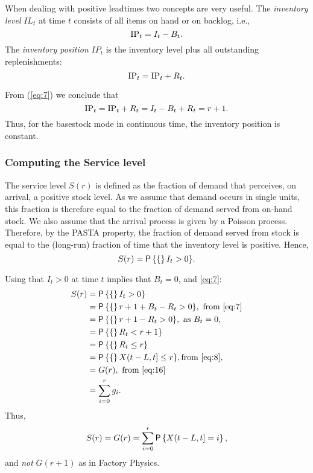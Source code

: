 When dealing with positive leadtimes two concepts are very useful. The \emph{inventory level} $IL_t$ at time $t$ consists of all items on hand or on backlog, i.e.,
\begin{equation}\label{eq:23}
  \textrm{IP}_t = I_t - B_t.
\end{equation}
The \emph{inventory position} $IP_t$ is the inventory level plus all outstanding replenishments:
\begin{equation*}
  \textrm{IP}_t = \textrm{IP}_t + R_t.
\end{equation*}

From (\ref{eq:7}) we conclude that 
\begin{equation}\label{eq:20}
\textrm{IP}_t =\textrm{IP}_t + R_t = I_t - B_t +R_t = r+1.
\end{equation}
Thus, for the basestock mode in continuous time, the inventory position is constant. 




\subsubsection{Computing the Service level}

The service level $S(r)$ is defined as the fraction of demand that
perceives, on arrival, a positive stock level. As we assume that demand
occurs in single units, this fraction is therefore equal to the fraction
of demand served from on-hand stock. We also assume that the arrival
process is given by a Poisson process. Therefore, by the PASTA property,
the fraction of demand served from stock is equal to the (long-run)
fraction of time that the inventory level is positive. Hence,
\begin{equation*}
   S(r) = \P\{I_t >0\}.
\end{equation*}

Using that $I_t>0$ at time $t$ implies that $B_t = 0$,
and \ref{eq:7}:
\begin{equation}\label{eq:10}
  \begin{split}
   S(r) &= \P\{I_t >0\} \\
   &= \P\{r+1 + B_t - R_t >0\}, \text{  from  \ref{eq:7}}  \\
   &= \P\{r+1 - R_t >0\}, \text{ as } B_t = 0, \\
   &= \P\{R_t < r+1\} \\
   &= \P\{R_t \leq r\} \\
   & = \P\{X(t-L,t] \leq  r\}, \text{from  \ref{eq:8}}, \\
   &= G(r),  \text{ from \ref{eq:16}} \\
   &=  \sum_{i=0}^{r} g_i.
  \end{split}
\end{equation}
Thus,
\begin{equation}
  \label{eq:13}
   S(r) = G(r) = \sum_{i=0}^r \P{X(t-L,t] = i},
\end{equation}
and \emph{not} $G(r+1)$ as in Factory Physics.

